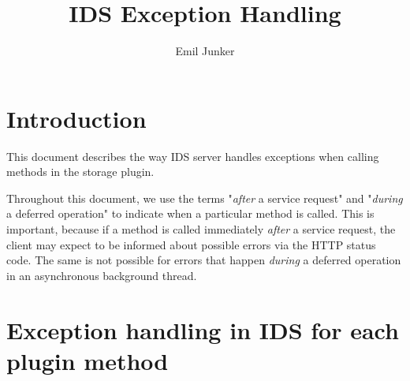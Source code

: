 \documentclass[paper=a4]{scrartcl}
\title{IDS Exception Handling}
\author{Emil Junker}
\begin{document}
\maketitle

\section{Introduction}

This document describes the way IDS server handles exceptions when calling methods in the storage plugin.

Throughout this document, we use the terms "\textit{after} a service request" and "\textit{during} a deferred operation" to indicate when a particular method is called.
This is important, because if a method is called immediately \textit{after} a service request, the client may expect to be informed about possible errors via the HTTP status code.
The same is not possible for errors that happen \textit{during} a deferred operation in an asynchronous background thread.

\pagebreak


\section{Exception handling in IDS for each plugin method}
\label{sec:pluginmethods}
\end{document}
